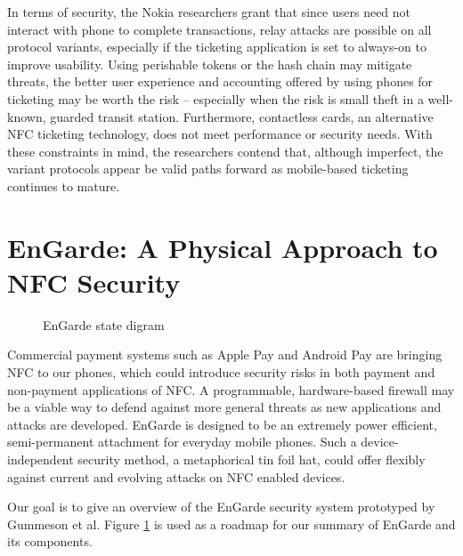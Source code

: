 \documentclass{sig-alternate}
\begin{document}
In terms of security, the Nokia researchers grant that since users need not interact with phone to complete transactions, relay attacks are possible on all protocol variants, especially if the ticketing application is set to always-on to improve usability. Using perishable tokens or the hash chain may mitigate threats, the better user experience and accounting offered by using phones for ticketing may be worth the risk -- especially when the risk is small theft in a well-known, guarded transit station. Furthermore, contactless cards, an alternative NFC ticketing technology, does not meet performance or security needs. With these constraints in mind, the researchers contend that, although imperfect, the variant protocols appear be valid paths forward as mobile-based ticketing continues to mature.
 


\section{EnGarde: A Physical Approach to NFC Security}
\label{sec:enGarde}

\begin{figure}
\centering
{}
\caption{EnGarde\cite{Gum2013} state digram}
\label{fig:states}
\end{figure}


Commercial payment systems such as Apple Pay and Android Pay are bringing NFC to our phones, which could introduce security risks in both payment and non-payment applications of NFC. A programmable, hardware-based firewall may be a viable way to defend against more general threats as new applications and attacks are developed. EnGarde is designed to be an extremely power efficient, semi-permanent attachment for everyday mobile phones. Such a device-independent security method, a metaphorical tin foil hat, could offer flexibly against current and evolving attacks on NFC enabled devices.~\cite{Gum2013}

Our goal is to give an overview of the EnGarde security system prototyped by Gummeson et al. Figure \ref{fig:states} is used as a roadmap for our summary of EnGarde and its components.
\end{document}
